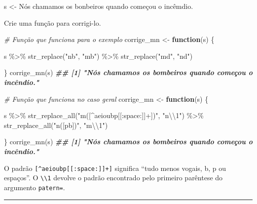 \documentclass[
]{book}
\newenvironment{Shaded}{\begin{snugshade}}{\end{snugshade}}
\newcommand{\CommentTok}[1]{\textcolor[rgb]{0.56,0.35,0.01}{\textit{#1}}}
\newcommand{\ControlFlowTok}[1]{\textcolor[rgb]{0.13,0.29,0.53}{\textbf{#1}}}
\newcommand{\DocumentationTok}[1]{\textcolor[rgb]{0.56,0.35,0.01}{\textbf{\textit{#1}}}}
\newcommand{\FunctionTok}[1]{\textcolor[rgb]{0.00,0.00,0.00}{#1}}
\newcommand{\NormalTok}[1]{#1}
\newcommand{\OtherTok}[1]{\textcolor[rgb]{0.56,0.35,0.01}{#1}}
\newcommand{\SpecialCharTok}[1]{\textcolor[rgb]{0.00,0.00,0.00}{#1}}
\newcommand{\StringTok}[1]{\textcolor[rgb]{0.31,0.60,0.02}{#1}}
\begin{document}
\begin{Shaded}
\begin{Highlighting}[]
\NormalTok{s }\OtherTok{\textless{}{-}} \StringTok{\textquotesingle{}Nós chamamos os bonbeiros quando começou o incêmdio.\textquotesingle{}}
\end{Highlighting}
\end{Shaded}

Crie uma função para corrigi-lo.

\begin{Shaded}
\begin{Highlighting}[]
\CommentTok{\# Função que funciona para o exemplo}
\NormalTok{corrige\_mn }\OtherTok{\textless{}{-}} \ControlFlowTok{function}\NormalTok{(s) \{}
  
\NormalTok{  s }\SpecialCharTok{\%\textgreater{}\%} 
    \FunctionTok{str\_replace}\NormalTok{(}\StringTok{"nb"}\NormalTok{, }\StringTok{"mb"}\NormalTok{) }\SpecialCharTok{\%\textgreater{}\%} 
    \FunctionTok{str\_replace}\NormalTok{(}\StringTok{"md"}\NormalTok{, }\StringTok{"nd"}\NormalTok{)}
  
\NormalTok{\}}
\FunctionTok{corrige\_mn}\NormalTok{(s)}
\DocumentationTok{\#\# [1] "Nós chamamos os bombeiros quando começou o incêndio."}

\CommentTok{\# Função que funciona no caso geral}
\NormalTok{corrige\_mn }\OtherTok{\textless{}{-}} \ControlFlowTok{function}\NormalTok{(s) \{}
  
\NormalTok{  s }\SpecialCharTok{\%\textgreater{}\%} 
    \FunctionTok{str\_replace\_all}\NormalTok{(}\StringTok{"m([\^{}aeioubp[[:space:]]+])"}\NormalTok{, }\StringTok{"n}\SpecialCharTok{\textbackslash{}\textbackslash{}}\StringTok{1"}\NormalTok{) }\SpecialCharTok{\%\textgreater{}\%}  
    \FunctionTok{str\_replace\_all}\NormalTok{(}\StringTok{"n([pb])"}\NormalTok{, }\StringTok{"m}\SpecialCharTok{\textbackslash{}\textbackslash{}}\StringTok{1"}\NormalTok{)}
  
\NormalTok{\}}
\FunctionTok{corrige\_mn}\NormalTok{(s)}
\DocumentationTok{\#\# [1] "Nós chamamos os bombeiros quando começou o incêndio."}
\end{Highlighting}
\end{Shaded}

O padrão \texttt{{[}\^{}aeioubp{[}{[}:space:{]}{]}+{]}} significa ``tudo menos vogais, b, p ou espaços''. O \texttt{\textbackslash{}\textbackslash{}1} devolve o padrão encontrado pelo primeiro parêntese do argumento \texttt{patern=}.

\begin{center}\rule{0.5\linewidth}{0.5pt}\end{center}
\end{document}
